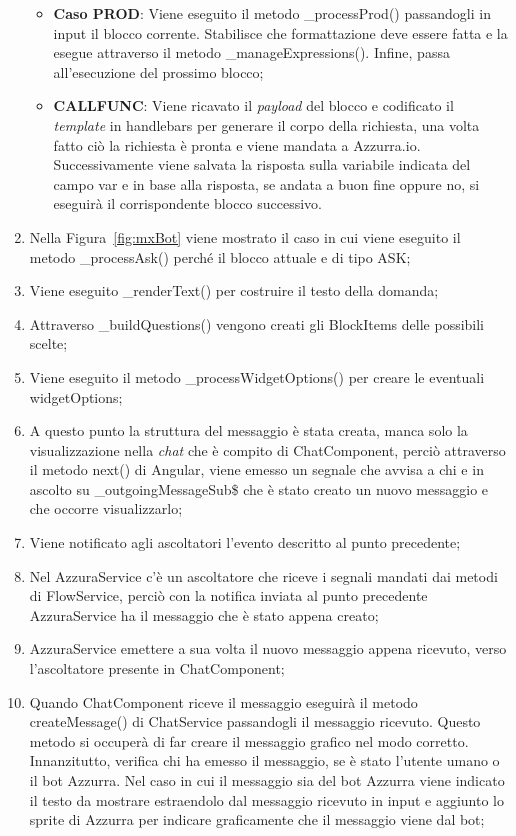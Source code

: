 \begin{enumerate}
\begin{itemize}
		\item \textbf{Caso PROD}: Viene eseguito il metodo \_processProd() passandogli in input il blocco corrente. Stabilisce che formattazione deve essere fatta e la esegue attraverso il metodo \_manageExpressions(). Infine, passa all'esecuzione del prossimo blocco;
		\item \textbf{CALLFUNC}: Viene ricavato il \emph{payload} del blocco e codificato il \emph{template} in handlebars per generare il corpo della richiesta, una volta fatto ciò la richiesta è pronta e viene mandata a Azzurra.io. Successivamente viene salvata la risposta sulla variabile indicata del campo var e in base alla risposta, se andata a buon fine oppure no, si eseguirà il corrispondente blocco successivo.
	\end{itemize}	
	\item Nella Figura~\ref{fig:mxBot} viene mostrato il caso in cui viene eseguito il metodo \_processAsk() perché il blocco attuale e di tipo ASK;
	\item Viene eseguito \_renderText() per costruire il testo della domanda;
	\item Attraverso \_buildQuestions() vengono creati gli BlockItems delle possibili scelte;
	\item Viene eseguito il metodo \_processWidgetOptions() per creare le eventuali widgetOptions;
	\item A questo punto la struttura del messaggio è stata creata, manca solo la visualizzazione nella \emph{chat} che è compito di ChatComponent, perciò attraverso il metodo next() di Angular, viene emesso un segnale che avvisa a chi e in ascolto su \_outgoingMessageSub\$ che è stato creato un nuovo messaggio e che occorre visualizzarlo;
	\item Viene notificato agli ascoltatori l'evento descritto al punto precedente;
	\item Nel AzzuraService c'è un ascoltatore che riceve i segnali mandati dai metodi di FlowService, perciò con la notifica inviata al punto precedente AzzuraService ha il messaggio che è stato appena creato;
	\item AzzuraService emettere a sua volta il nuovo messaggio appena ricevuto, verso l'ascoltatore presente in ChatComponent;
	\item Quando ChatComponent riceve il messaggio eseguirà il metodo createMessage() di ChatService passandogli il messaggio ricevuto. Questo metodo si occuperà di far creare il messaggio grafico nel modo corretto.
	Innanzitutto, verifica chi ha emesso il messaggio, se è stato l'utente umano o il bot Azzurra. Nel caso in cui il messaggio sia del bot Azzurra viene indicato il testo da mostrare estraendolo dal messaggio ricevuto in input e aggiunto lo sprite di Azzurra per indicare graficamente che il messaggio viene dal bot;

\end{enumerate}
